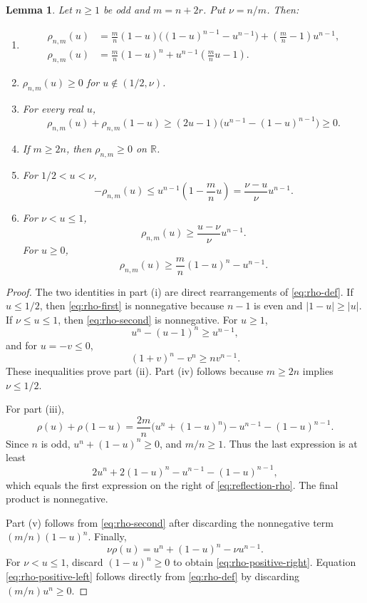 \documentclass[11pt]{article}
\numberwithin{equation}{section}
\newtheorem{lemma}[theorem]{Lemma}
\newcommand{\R}{\mathbb R}
\begin{document}
\begin{lemma}\label{lem:rho}
Let $n\ge1$ be odd and $m=n+2r$. Put $\nu=n/m$. Then:
\begin{enumerate}[label=\textup{(\roman*)},leftmargin=2.2em]
\item
\begin{align}
 \rho_{n,m}(u)
 &=\frac mn(1-u)\bigl((1-u)^{n-1}-u^{n-1}\bigr)
   +\left(\frac mn-1\right)u^{n-1},\label{eq:rho-first}\\
 \rho_{n,m}(u)
 &=\frac mn(1-u)^n+u^{n-1}\left(\frac mn u-1\right).
 \label{eq:rho-second}
\end{align}
\item $\rho_{n,m}(u)\ge0$ for $u\notin(1/2,\nu)$.
\item For every real $u$,
\begin{equation}\label{eq:reflection-rho}
 \rho_{n,m}(u)+\rho_{n,m}(1-u)
 \ge(2u-1)\bigl(u^{n-1}-(1-u)^{n-1}\bigr)\ge0.
\end{equation}
\item If $m\ge2n$, then $\rho_{n,m}\ge0$ on $\R$.
\item For $1/2<u<\nu$,
\begin{equation}\label{eq:rho-negative}
 -\rho_{n,m}(u)
 \le u^{n-1}\left(1-\frac mn u\right)
 =\frac{\nu-u}{\nu}u^{n-1}.
\end{equation}
\item For $\nu<u\le1$,
\begin{equation}\label{eq:rho-positive-right}
 \rho_{n,m}(u)\ge\frac{u-\nu}{\nu}u^{n-1}.
\end{equation}
For $u\ge0$,
\begin{equation}\label{eq:rho-positive-left}
 \rho_{n,m}(u)\ge\frac mn(1-u)^n-u^{n-1}.
\end{equation}
\end{enumerate}
\end{lemma}

\begin{proof}
The two identities in part (i) are direct rearrangements of \eqref{eq:rho-def}. If $u\le1/2$, then \eqref{eq:rho-first} is nonnegative because $n-1$ is even and $|1-u|\ge|u|$. If $\nu\le u\le1$, then \eqref{eq:rho-second} is nonnegative. For $u\ge1$,
\[
        u^n-(u-1)^n\ge u^{n-1},
\]
and for $u=-v\le0$,
\[
        (1+v)^n-v^n\ge nv^{n-1}.
\]
These inequalities prove part (ii). Part (iv) follows because $m\ge2n$ implies $\nu\le1/2$.

For part (iii),
\[
 \rho(u)+\rho(1-u)
 =\frac{2m}{n}\bigl(u^n+(1-u)^n\bigr)
  -u^{n-1}-(1-u)^{n-1}.
\]
Since $n$ is odd, $u^n+(1-u)^n\ge0$, and $m/n\ge1$. Thus the last expression is at least
\[
        2u^n+2(1-u)^n-u^{n-1}-(1-u)^{n-1},
\]
which equals the first expression on the right of \eqref{eq:reflection-rho}. The final product is nonnegative.

Part (v) follows from \eqref{eq:rho-second} after discarding the nonnegative term $(m/n)(1-u)^n$. Finally,
\[
        \nu\rho(u)=u^n+(1-u)^n-\nu u^{n-1}.
\]
For $\nu<u\le1$, discard $(1-u)^n\ge0$ to obtain \eqref{eq:rho-positive-right}. Equation \eqref{eq:rho-positive-left} follows directly from \eqref{eq:rho-def} by discarding $(m/n)u^n\ge0$.
\end{proof}
\end{document}
